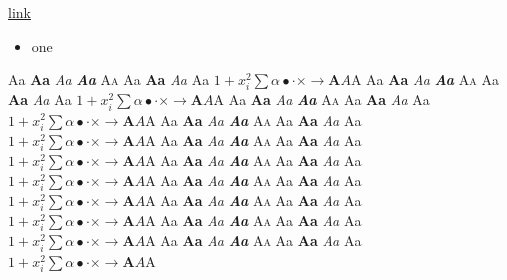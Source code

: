 \documentclass[11pt]{article}
\newcommand{\faces}{Aa {\bfseries Aa} {\itshape Aa} {\bfseries\itshape Aa} {\scshape Aa} {\sffamily Aa {\bfseries Aa} {\itshape Aa}} {\ttfamily Aa} $1+x^{2}_{i}\sum\alpha\bullet\cdot\times\rightarrow\mathbf{A}\mathit{A}\mathrm{A}$ \textbullet}
\begin{document}
\href{https://example.org}{link}
\begin{itemize}\item one\end{itemize}
{\tiny\faces} {\scriptsize\faces} {\footnotesize\faces} {\small\faces} {\normalsize\faces}
{\large\faces} {\Large\faces} {\LARGE\faces} {\huge\faces} {\Huge\faces}
\end{document}
